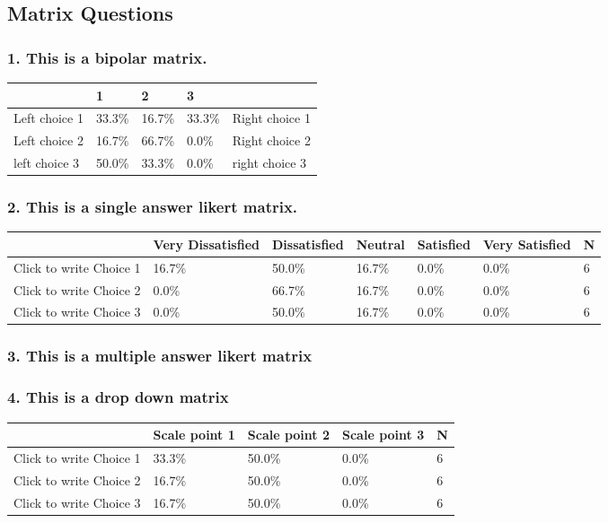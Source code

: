 \documentclass{article}\usepackage[]{graphicx}\usepackage[]{color}
\begin{document}
\subsection*{Matrix Questions}
\subsubsection*{1.
This is a bipolar matrix.}


\begin{tabular}{l|l|l|l|l}
\hline
 & 1 & 2 & 3 & \\
\hline
Left choice 1 & 33.3\% & 16.7\% & 33.3\% & Right choice 1\\
\hline
Left choice 2 & 16.7\% & 66.7\% & 0.0\% & Right choice 2\\
\hline
left choice 3 & 50.0\% & 33.3\% & 0.0\% & right choice 3\\
\hline
\end{tabular}


\hfill \break \hfill \break
\subsubsection*{2.
This is a single answer likert matrix.}


\begin{tabular}{l|l|l|l|l|l|l}
\hline
 & Very Dissatisfied & Dissatisfied  & Neutral & Satisfied & Very Satisfied & N\\
\hline
Click to write Choice 1 & 16.7\% & 50.0\% & 16.7\% & 0.0\% & 0.0\% & 6\\
\hline
Click to write Choice 2 & 0.0\% & 66.7\% & 16.7\% & 0.0\% & 0.0\% & 6\\
\hline
Click to write Choice 3 & 0.0\% & 50.0\% & 16.7\% & 0.0\% & 0.0\% & 6\\
\hline
\end{tabular}


\hfill \break \hfill \break
\subsubsection*{3.
This is a multiple answer likert matrix}


\hfill \break \hfill \break
\subsubsection*{4.
This is a drop down matrix}


\begin{tabular}{l|l|l|l|l}
\hline
 & Scale point 1 & Scale point 2 & Scale point 3 & N\\
\hline
Click to write Choice 1 & 33.3\% & 50.0\% & 0.0\% & 6\\
\hline
Click to write Choice 2 & 16.7\% & 50.0\% & 0.0\% & 6\\
\hline
Click to write Choice 3 & 16.7\% & 50.0\% & 0.0\% & 6\\
\hline
\end{tabular}
\end{document}
